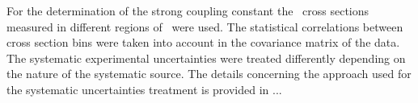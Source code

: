 For the determination of the strong coupling constant the \dsdetjetb~cross sections measured in different regions of \qsq~were used. The statistical correlations between cross section bins were taken into account in the covariance matrix of the data. The systematic experimental uncertainties were treated differently depending on the nature of the systematic source. The details concerning the approach used for the systematic uncertainties treatment is provided in ...


